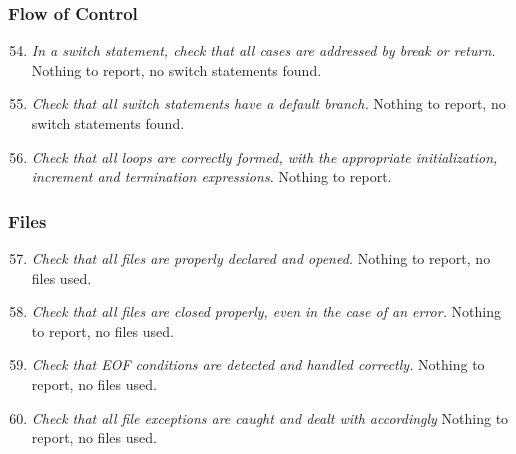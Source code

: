 	\subsubsection{Flow of Control}
		\begin{enumerate}
			\setcounter{enumi}{53}
			\item \textit{In a switch statement, check that all cases are addressed by break or return.}\newline
			Nothing to report, no switch statements found. %

			\item \textit{Check that all switch statements have a default branch.}\newline
			Nothing to report, no switch statements found. %

			\item \textit{Check that all loops are correctly formed, with the appropriate initialization, increment and termination expressions.}\newline
			Nothing to report. %
		\end{enumerate}

	\subsubsection{Files}
		\begin{enumerate}
			\setcounter{enumi}{56}
			\item \textit{Check that all files are properly declared and opened.}\newline
			Nothing to report, no files used. %

			\item \textit{Check that all files are closed properly, even in the case of an error.}\newline
			Nothing to report, no files used. %

			\item \textit{Check that EOF conditions are detected and handled correctly.}\newline
			Nothing to report, no files used. %

			\item \textit{Check that all file exceptions are caught and dealt with accordingly}\newline
			Nothing to report, no files used. %
		\end{enumerate}
